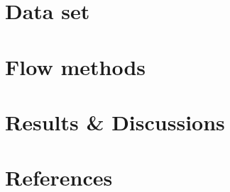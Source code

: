 \documentclass[12pt]{article}
\begin{document}
{\section{Data set}

%


\FloatBarrier
\section{Flow methods}


\FloatBarrier
\section{Results \& Discussions}


\newpage
\section*{References}

}
\end{document}

